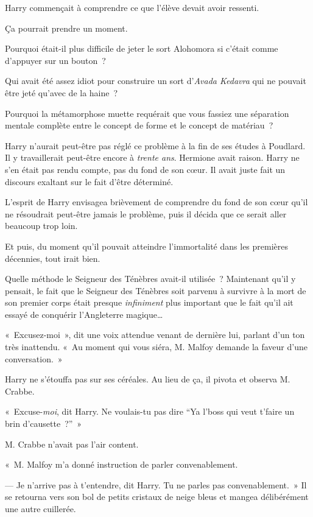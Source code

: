 Harry commençait à comprendre ce que l'élève devait avoir ressenti.

Ça pourrait prendre un moment.

Pourquoi était-il plus difficile de jeter le sort Alohomora si c'était comme d'appuyer sur un bouton~?

Qui avait été assez idiot pour construire un sort d'\emph{Avada Kedavra} qui ne pouvait être jeté qu'avec de la haine~?

Pourquoi la métamorphose muette requérait que vous fassiez une séparation mentale complète entre le concept de forme et le concept de matériau~?

Harry n'aurait peut-être pas réglé ce problème à la fin de ses études à Poudlard.
Il y travaillerait peut-être encore à \emph{trente ans}.
Hermione avait raison.
Harry ne s'en était pas rendu compte, pas du fond de son cœur.
Il avait juste fait un discours exaltant sur le fait d'être déterminé.

L'esprit de Harry envisagea brièvement de comprendre du fond de son cœur qu'il ne résoudrait peut-être jamais le problème, puis il décida que ce serait aller beaucoup trop loin.

Et puis, du moment qu'il pouvait atteindre l'immortalité dans les premières décennies, tout irait bien.

Quelle méthode le Seigneur des Ténèbres avait-il utilisée~?
Maintenant qu'il y pensait, le fait que le Seigneur des Ténèbres soit parvenu à survivre à la mort de son premier corps était presque \emph{infiniment} plus important que le fait qu'il ait essayé de conquérir l'Angleterre magique…

«~Excusez-moi~», dit une voix attendue venant de dernière lui, parlant d'un ton très inattendu.
«~Au moment qui vous siéra, M. Malfoy demande la faveur d'une conversation.~»

Harry ne s'étouffa pas sur ses céréales.
Au lieu de ça, il pivota et observa M. Crabbe.

«~Excuse-\emph{moi}, dit Harry.
Ne voulais-tu pas dire “Ya l'boss qui veut t'faire un brin d'causette~?”~»

M. Crabbe n'avait pas l'air content.

«~M. Malfoy m'a donné instruction de parler convenablement.

--- Je n'arrive pas à t'entendre, dit Harry.
Tu ne parles pas convenablement.~»
Il se retourna vers son bol de petits cristaux de neige bleus et mangea délibérément une autre cuillerée.

